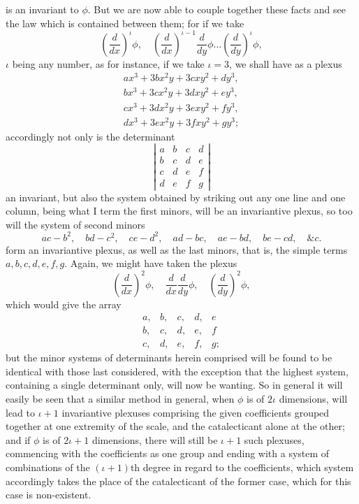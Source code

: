\documentclass[11pt]{article}
\newcommand{\sourcepage}[1]{\marginpar{\scriptsize p.~#1}}
\begin{document}
{{\sourcepage{347}
is an invariant to $\phi$. But we are now able to couple together these facts and see the law which is contained between them; for if we take
\[
\left(\frac{d}{dx}\right)^\iota\phi,\quad
\left(\frac{d}{dx}\right)^{\iota-1}\frac{d}{dy}\phi\ldots
\left(\frac{d}{dy}\right)^\iota\phi,
\]
$\iota$ being any number, as for instance, if we take $\iota=3$, we shall have as a plexus
\[
\begin{array}{l}
ax^3+3bx^2y+3cxy^2+dy^3,\\
bx^3+3cx^2y+3dxy^2+ey^3,\\
cx^3+3dx^2y+3exy^2+fy^3,\\
dx^3+3ex^2y+3fxy^2+gy^3;
\end{array}
\]
accordingly not only is the determinant
\[
\left|\begin{array}{cccc}
a&b&c&d\\
b&c&d&e\\
c&d&e&f\\
d&e&f&g
\end{array}\right|
\]
an invariant, but also the system obtained by striking out any one line and one column, being what I term the first minors, will be an invariantive plexus, so too will the system of second minors
\[
ac-b^2,\quad bd-c^2,\quad ce-d^2,\quad
ad-bc,\quad ae-bd,\quad be-cd,\quad \&c.
\]
form an invariantive plexus, as well as the last minors, that is, the simple terms $a,b,c,d,e,f,g$. Again, we might have taken the plexus
\[
\left(\frac{d}{dx}\right)^2\phi,\quad
\frac{d}{dx}\frac{d}{dy}\phi,\quad
\left(\frac{d}{dy}\right)^2\phi,
\]
which would give the array
\[
\begin{array}{ccccc}
a,&b,&c,&d,&e\\
b,&c,&d,&e,&f\\
c,&d,&e,&f,&g;
\end{array}
\]
but the minor systems of determinants herein comprised will be found to be identical with those last considered, with the exception that the highest system, containing a single determinant only, will now be wanting. So in general it will easily be seen that a similar method in general, when $\phi$ is of $2\iota$ dimensions, will lead to $\iota+1$ invariantive plexuses comprising the given coefficients grouped together at one extremity of the scale, and the catalecticant alone at the other; and if $\phi$ is of $2\iota+1$ dimensions, there will still be $\iota+1$ such plexuses, commencing with the coefficients as one group and ending with a system of combinations of the $(\iota+1)$th degree in regard to the coefficients, which system accordingly takes the place of the catalecticant of the former case, which for this case is non-existent.

}}
\end{document}
